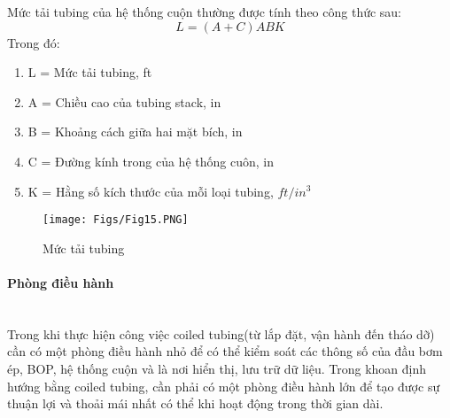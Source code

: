 \documentclass[12pt,a4paper]{article}
\newcommand{\subsubsubsection}[1]{\paragraph{#1}\mbox{}\\}
\begin{document}
	\newpage
	Mức tải tubing của hệ thống cuộn thường được tính theo công thức sau:
	\begin{equation}
	L = (A + C)ABK
	\end{equation}
	Trong đó:
	\begin{enumerate}
		\item[] L = Mức tải tubing, ft
		\item[] A = Chiều cao của tubing stack, in
		\item[] B = Khoảng cách giữa hai mặt bích, in
		\item[] C = Đường kính trong của hệ thống cuôn, in
		\item[] K = Hằng số kích thước của mỗi loại tubing, $ft/in^3$
	\end{enumerate}
	\begin{figure}[h]
	\centering
	\texttt{[image: Figs/Fig15.PNG]}
	\caption{Mức tải tubing\cite{rehm2013underbalanced}}
	\end{figure}
	\subsubsubsection{Phòng điều hành}
	Trong khi thực hiện công việc coiled tubing(từ lắp đặt, vận hành đến tháo dỡ) cần có một phòng điều hành nhỏ để có thể kiểm soát các thông số của đầu bơm ép, BOP, hệ thống cuộn và là nơi hiển thị, lưu trữ dữ liệu. Trong khoan định hướng bằng coiled tubing, cần phải có một phòng điều hành lớn để tạo được sự thuận lợi và thoải mái nhất có thể khi hoạt động trong thời gian dài.
\end{document}
